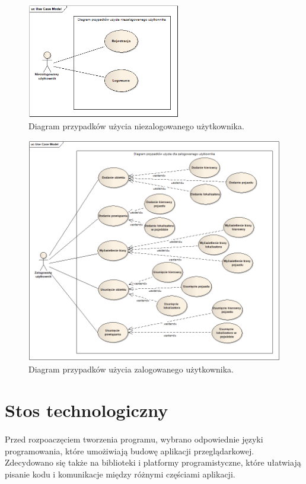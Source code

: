 \begin{figure}
\centering
\includegraphics[width=0.6\textwidth]{./graf/Przypadki_uzycia_niezalogowany.png}
\caption{Diagram przypadków użycia niezalogowanego użytkownika.}
\label{fig:3.1}
\end{figure}

\begin{figure}
\centering
\includegraphics[width=1\textwidth]{./graf/Przypadki_uzycia_zalogowany.png}
\caption{Diagram przypadków użycia zalogowanego użytkownika.}
\label{fig:3.2}
\end{figure}

\section{Stos technologiczny}
\paragraph{}
Przed rozpoaczęciem tworzenia programu, wybrano odpowiednie języki programowania, które umożiwiają budowę aplikacji przeglądarkowej. Zdecydowano się także na biblioteki i platformy programistyczne, które ułatwiają pisanie kodu i komunikacje między różnymi częściami aplikacji.


